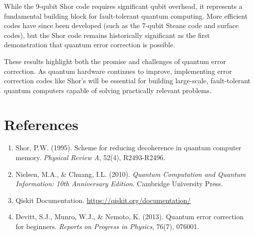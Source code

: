 \documentclass[12pt,a4paper]{article}
\begin{document}
While the 9-qubit Shor code requires significant qubit overhead, it represents a fundamental building block for fault-tolerant quantum computing. More efficient codes have since been developed (such as the 7-qubit Steane code and surface codes), but the Shor code remains historically significant as the first demonstration that quantum error correction is possible.

These results highlight both the promise and challenges of quantum error correction. As quantum hardware continues to improve, implementing error correction codes like Shor's will be essential for building large-scale, fault-tolerant quantum computers capable of solving practically relevant problems.

\section{References}

\begin{enumerate}
    \item Shor, P.W. (1995). Scheme for reducing decoherence in quantum computer memory. \textit{Physical Review A}, 52(4), R2493-R2496.
    \item Nielsen, M.A., \& Chuang, I.L. (2010). \textit{Quantum Computation and Quantum Information: 10th Anniversary Edition}. Cambridge University Press.
    \item Qiskit Documentation. \url{https://qiskit.org/documentation/}
    \item Devitt, S.J., Munro, W.J., \& Nemoto, K. (2013). Quantum error correction for beginners. \textit{Reports on Progress in Physics}, 76(7), 076001.
\end{enumerate}
\end{document}
